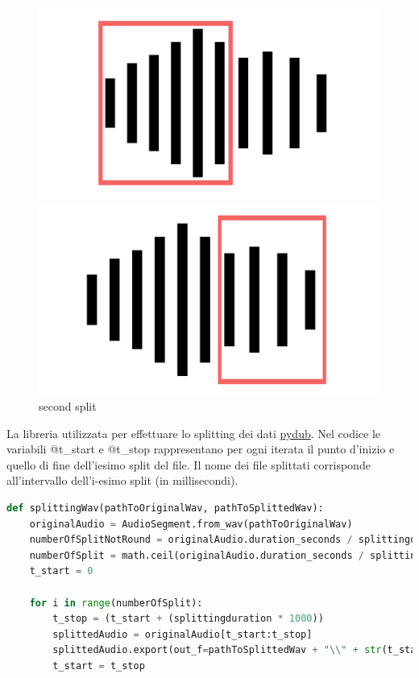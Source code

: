 \begin{figure}[h]
   \begin{minipage}{0.48\textwidth}
     \centering
     \includegraphics[width=0.85\linewidth]{imgs/capitolo4/suddivisione.png}
     \caption{first split}
         \label{fig:split2}
   \end{minipage}\hfill
   \begin{minipage}{0.48\textwidth}
     \centering
     \includegraphics[width=0.85\linewidth]{imgs/capitolo4/suddivisione2.png}
     \caption{second split}
     \label{fig:split1}
   \end{minipage}
   
\end{figure}
\FloatBarrier 
La libreria utilizzata per effettuare lo splitting dei dati \href{https://github.com/jiaaro/pydub#installation}{pydub}\cite{pydub}. Nel codice le variabili @t\_start e @t\_stop rappresentano per ogni iterata il punto d'inizio e quello di fine dell'iesimo split del file. Il nome dei file splittati corrisponde all’intervallo dell’i-esimo split (in millisecondi). 

\begin{lstlisting}[language=Python, caption=Splitting wav function, label = lst:splitFun]
def splittingWav(pathToOriginalWav, pathToSplittedWav):
    originalAudio = AudioSegment.from_wav(pathToOriginalWav)
    numberOfSplitNotRound = originalAudio.duration_seconds / splittingduration
    numberOfSplit = math.ceil(originalAudio.duration_seconds / splittingduration)
    t_start = 0
    
    for i in range(numberOfSplit):
        t_stop = (t_start + (splittingduration * 1000))  
        splittedAudio = originalAudio[t_start:t_stop]
        splittedAudio.export(out_f=pathToSplittedWav + "\\" + str(t_start) + " - " + str(t_stop) + '.wav',format="wav")         
        t_start = t_stop
\end{lstlisting}

